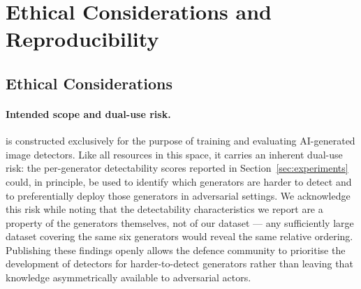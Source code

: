 %
%

\section{Ethical Considerations and Reproducibility}
\label{sec:ethics}

\subsection{Ethical Considerations}
\label{ssec:ethics_content}

\paragraph{Intended scope and dual-use risk.}
\textbf{\datasetname} is constructed exclusively for the purpose of
training and evaluating AI-generated image detectors.
Like all resources in this space, it carries an inherent dual-use
risk: the per-generator detectability scores reported in
Section~\ref{sec:experiments} could, in principle, be used to
identify which generators are harder to detect and to preferentially
deploy those generators in adversarial settings.
We acknowledge this risk while noting that the detectability
characteristics we report are a property of the generators themselves,
not of our dataset — any sufficiently large dataset covering the same
six generators would reveal the same relative ordering.
Publishing these findings openly allows the defence community to
prioritise the development of detectors for harder-to-detect
generators rather than leaving that knowledge asymmetrically available
to adversarial actors.

